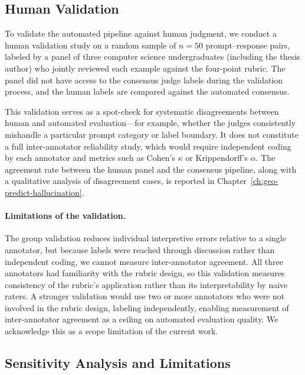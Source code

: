 \subsection{Human Validation}
\label{sec:human-validation}

To validate the automated pipeline against human judgment, we conduct a human validation study on a random sample of $n = 50$ prompt--response pairs, labeled by a panel of three computer science undergraduates (including the thesis author) who jointly reviewed each example against the four-point rubric. The panel did not have access to the consensus judge labels during the validation process, and the human labels are compared against the automated consensus.

This validation serves as a spot-check for systematic disagreements between human and automated evaluation---for example, whether the judges consistently mishandle a particular prompt category or label boundary. It does not constitute a full inter-annotator reliability study, which would require independent coding by each annotator and metrics such as Cohen's $\kappa$ or Krippendorff's $\alpha$. The agreement rate between the human panel and the consensus pipeline, along with a qualitative analysis of disagreement cases, is reported in Chapter~\ref{ch:geo-predict-hallucination}.


\paragraph{Limitations of the validation.} The group validation reduces individual interpretive errors relative to a single annotator, but because labels were reached through discussion rather than independent coding, we cannot measure inter-annotator agreement. All three annotators had familiarity with the rubric design, so this validation measures consistency of the rubric's application rather than its interpretability by naive raters. A stronger validation would use two or more annotators who were not involved in the rubric design, labeling independently, enabling measurement of inter-annotator agreement as a ceiling on automated evaluation quality. We acknowledge this as a scope limitation of the current work.

\subsection{Sensitivity Analysis and Limitations}
\label{sec:sensitivity}

